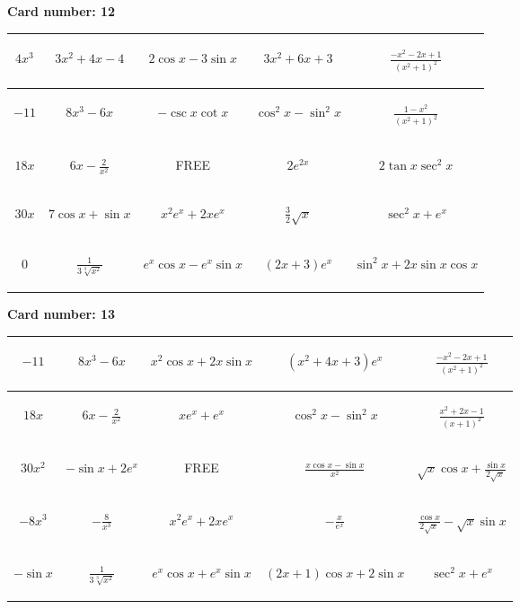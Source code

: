 \documentclass{article}
\newcommand{\entry}[1]{\begin{minipage}[t][2.75cm][t]{4cm} \vspace{1cm} \begin{center}#1\end{center} \end{minipage}}
\newcommand{\freespace}{\entry{FREE}}
\newcommand{\cardnumber}[1]{\noindent \textbf{Card number: #1} \bigskip}
\begin{document}
\pagebreak

\cardnumber{12}
\begin{center}
\begin{tabular}{|*{5}{c|}}
    \hline
    \entry{$4x^3$} & \entry{$3x^2 + 4x - 4$} & \entry{$2 \cos x - 3 \sin x$} & \entry{$3x^2 + 6x + 3$} & \entry{$\frac{-x^2 - 2x + 1}{(x^2 + 1)^2}$} \\ \hline
    \entry{$-11$} & \entry{$8x^3 - 6x$} & \entry{$-\csc x \cot x$} & \entry{$\cos^2 x - \sin^2 x$} & \entry{$\frac{1 - x^2}{(x^2 + 1)^2}$} \\ \hline
    \entry{$18x$} & \entry{$6x - \frac{2}{x^2}$} & \freespace & \entry{$2e^{2x}$} & \entry{$2 \tan x \sec^2 x$} \\ \hline
    \entry{$30x$} & \entry{$7 \cos x + \sin x$} & \entry{$x^2 e^x + 2x e^x$} & \entry{$\frac{3}{2} \sqrt{x}$} & \entry{$\sec^2 x + e^x$} \\ \hline
    \entry{$0$} & \entry{$\frac{1}{3\sqrt[3]{x^2}}$} & \entry{$e^x \cos x - e^x \sin x$} & \entry{$(2x + 3) e^x$} & \entry{$\sin^2 x + 2x \sin x \cos x$} \\ \hline
\end{tabular}
\end{center}

\pagebreak

\cardnumber{13}
\begin{center}
\begin{tabular}{|*{5}{c|}}
    \hline
    \entry{$-11$} & \entry{$8x^3 - 6x$} & \entry{$x^2 \cos x + 2x \sin x$} & \entry{$(x^2 + 4x + 3) e^x$} & \entry{$\frac{-x^2 - 2x + 1}{(x^2 + 1)^2}$} \\ \hline
    \entry{$18x$} & \entry{$6x - \frac{2}{x^2}$} & \entry{$x e^x + e^x$} & \entry{$\cos^2 x - \sin^2 x$} & \entry{$\frac{x^2 + 2x - 1}{(x + 1)^2}$} \\ \hline
    \entry{$30x^2$} & \entry{$-\sin x + 2e^x$} & \freespace & \entry{$\frac{x \cos x - \sin x}{x^2}$} & \entry{$\sqrt{x} \cos x + \frac{\sin x}{2 \sqrt{x}}$} \\ \hline
    \entry{$-8x^3$} & \entry{$-\frac{8}{x^3}$} & \entry{$x^2 e^x + 2x e^x$} & \entry{$-\frac{x}{e^x}$} & \entry{$\frac{\cos x}{2 \sqrt{x}} - \sqrt{x} \sin x$} \\ \hline
    \entry{$-\sin x$} & \entry{$\frac{1}{3\sqrt[3]{x^2}}$} & \entry{$e^x \cos x + e^x \sin x$} & \entry{$(2x + 1) \cos x + 2 \sin x$} & \entry{$\sec^2 x + e^x$} \\ \hline
\end{tabular}
\end{center}
\end{document}
